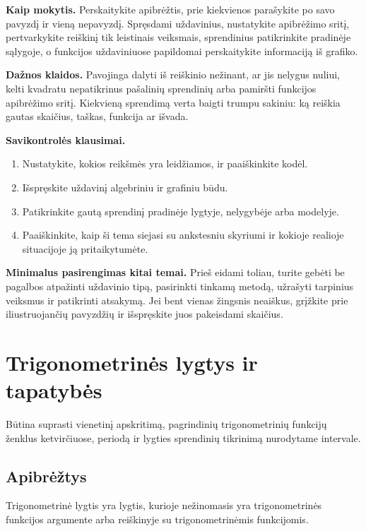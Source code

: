 \textbf{Kaip mokytis.} Perskaitykite apibrėžtis, prie kiekvienos parašykite po savo pavyzdį ir vieną nepavyzdį. Spręsdami uždavinius, nustatykite apibrėžimo sritį, pertvarkykite reiškinį tik leistinais veiksmais, sprendinius patikrinkite pradinėje sąlygoje, o funkcijos uždaviniuose papildomai perskaitykite informaciją iš grafiko.

\textbf{Dažnos klaidos.} Pavojinga dalyti iš reiškinio nežinant, ar jis nelygus nuliui, kelti kvadratu nepatikrinus pašalinių sprendinių arba pamiršti funkcijos apibrėžimo sritį. Kiekvieną sprendimą verta baigti trumpu sakiniu: ką reiškia gautas skaičius, taškas, funkcija ar išvada.

\textbf{Savikontrolės klausimai.}
\begin{enumerate}[label=\arabic*.]
\item Nustatykite, kokios reikšmės yra leidžiamos, ir paaiškinkite kodėl.
\item Išspręskite uždavinį algebriniu ir grafiniu būdu.
\item Patikrinkite gautą sprendinį pradinėje lygtyje, nelygybėje arba modelyje.
\item Paaiškinkite, kaip ši tema siejasi su ankstesniu skyriumi ir kokioje realioje situacijoje ją pritaikytumėte.
\end{enumerate}

\textbf{Minimalus pasirengimas kitai temai.} Prieš eidami toliau, turite gebėti be pagalbos atpažinti uždavinio tipą, pasirinkti tinkamą metodą, užrašyti tarpinius veiksmus ir patikrinti atsakymą. Jei bent vienas žingsnis neaiškus, grįžkite prie iliustruojančių pavyzdžių ir išspręskite juos pakeisdami skaičius.

\section{Trigonometrinės lygtys ir tapatybės}\label{sec:trigonometrines-lygtys-ir-tapatybes}

\begin{tcolorbox}[title=Prieš pradedant, colback=green!5]
Būtina suprasti vienetinį apskritimą, pagrindinių trigonometrinių funkcijų ženklus ketvirčiuose, periodą ir lygties sprendinių tikrinimą nurodytame intervale.
\end{tcolorbox}
\subsection{Apibrėžtys}

\begin{apibreztis}
Trigonometrinė lygtis yra lygtis, kurioje nežinomasis yra trigonometrinės funkcijos argumente arba reiškinyje su trigonometrinėmis funkcijomis.
\end{apibreztis}

